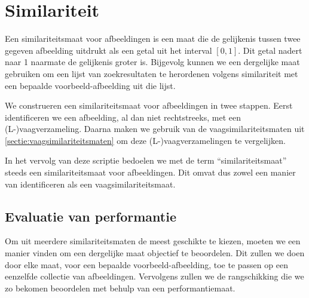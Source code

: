 \chapter{Similariteit}

Een similariteitsmaat voor afbeeldingen is een maat die de gelijkenis tussen twee gegeven
afbeelding uitdrukt als een getal uit het interval $[0,1]$. Dit getal nadert naar 1
naarmate de gelijkenis groter is. Bijgevolg kunnen we een dergelijke maat gebruiken om
een lijst van zoekresultaten te herordenen volgens similariteit met een bepaalde 
voorbeeld-afbeelding uit die lijst. 

We construeren een similariteitsmaat voor afbeeldingen in twee stappen. Eerst identificeren we
een afbeelding, al dan niet rechtstreeks, met een (L-)vaagverzameling. Daarna maken we gebruik van
de vaagsimilariteitsmaten uit \ref{sectie:vaagsimilariteitsmaten} om deze (L-)vaagverzamelingen te
vergelijken. 

In het vervolg van deze scriptie bedoelen we met de term ``similariteitsmaat'' steeds
een similariteitsmaat voor afbeeldingen. Dit omvat dus zowel een manier van identificeren als een 
vaagsimilariteitsmaat.

\section{Evaluatie van performantie}

Om uit meerdere similariteitsmaten de meest geschikte te kiezen, 
moeten we een manier vinden om een dergelijke maat objectief te beoordelen. 
Dit zullen we doen door elke
maat, voor een bepaalde voorbeeld-afbeelding, toe te passen op een eenzelfde collectie 
van afbeeldingen. Vervolgens zullen we de rangschikking die we zo bekomen
beoordelen met behulp van een performantiemaat.



